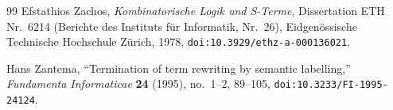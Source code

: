 \documentclass[11pt,reqno]{amsart}
\numberwithin{equation}{section}
\theoremstyle{plain}
\theoremstyle{definition}
\theoremstyle{remark}
\begin{document}
\begin{thebibliography}{99}
Efstathios Zachos,
\emph{Kombinatorische Logik und S-Terme},
Dissertation ETH Nr.~6214 (Berichte des Instituts f{\"u}r Informatik, Nr.~26),
Eidgen{\"o}ssische Technische Hochschule Z{\"u}rich, 1978,
\texttt{doi:10.3929/ethz-a-000136021}.

Hans Zantema,
``Termination of term rewriting by semantic labelling,''
\emph{Fundamenta Informaticae} \textbf{24} (1995), no.~1--2, 89--105,
\texttt{doi:10.3233/FI-1995-24124}.

\end{thebibliography}
\end{document}
